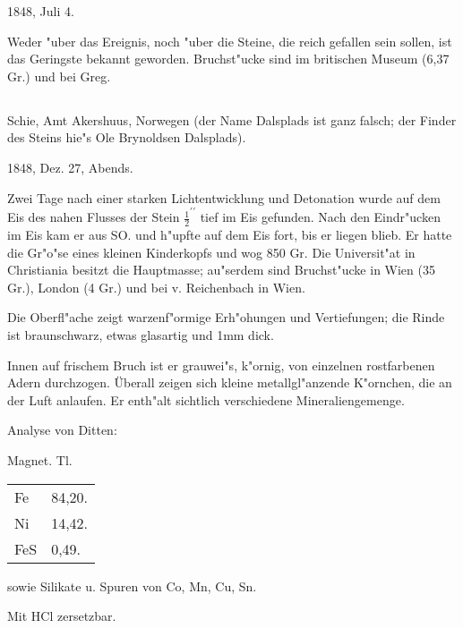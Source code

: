 \documentclass[a4paper, 11pt, oneside]{article}
\begin{document}
1848, Juli 4.

Weder "uber das Ereignis, noch "uber die Steine, die reich gefallen sein sollen, ist das Geringste bekannt geworden. Bruchst"ucke sind im britischen Museum (6,37 Gr.) und bei Greg.

\subsection{}
\LARGE
\paragraph{}
Schie, Amt Akershuus, Norwegen (der Name Dalsplads ist ganz falsch; der Finder des Steins hie"s Ole Brynoldsen Dalsplads).

1848, Dez. 27, Abends.

Zwei Tage nach einer starken Lichtentwicklung und Detonation wurde auf dem Eis des nahen Flusses der Stein $\mathfrak{\frac{1}{2}^{\prime\prime}}$ tief im Eis gefunden. Nach den Eindr"ucken im Eis kam er aus SO. und h"upfte auf dem Eis fort, bis er liegen blieb. Er hatte die Gr"o"se eines kleinen Kinderkopfs und wog 850 Gr. Die Universit"at in Christiania besitzt die Hauptmasse; au"serdem sind Bruchst"ucke in Wien (35 Gr.), London (4 Gr.) und bei v. Reichenbach in Wien.

Die Oberfl"ache zeigt warzenf"ormige Erh"ohungen und Vertiefungen; die Rinde ist braunschwarz, etwas glasartig und 1mm dick.

Innen auf frischem Bruch ist er grauwei"s, k"ornig, von einzelnen rostfarbenen Adern durchzogen. Überall zeigen sich kleine metallgl"anzende K"ornchen, die an der Luft anlaufen. Er enth"alt sichtlich verschiedene Mineraliengemenge.

Analyse von Ditten:
\begin{center}
Magnet. Tl. 
\end{center}

\begin{table}[H]
    \centering\swabfamily\Large
    \begin{tabular}{l l}
        Fe & 84,20. \\
        Ni & 14,42. \\
        FeS & 0,49. \\
    \end{tabular}
\end{table}

sowie Silikate u. Spuren von Co, Mn, Cu, Sn.

\begin{center}
Mit HCl zersetzbar.
\end{center}
\end{document}
